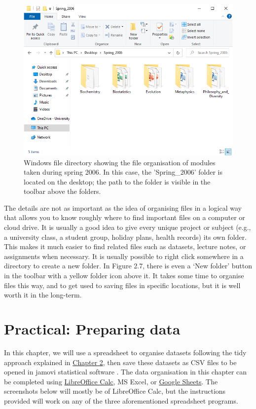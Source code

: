 \documentclass[
]{scrbook}
\begin{document}
\begin{figure}
\includegraphics[width=1\linewidth]{img/directory_windows} \caption{Windows file directory showing the file organisation of modules taken during spring 2006. In this case, the 'Spring\_2006' folder is located on the desktop; the path to the folder is visible in the toolbar above the folders.}\label{fig:unnamed-chunk-10}
\end{figure}

The details are not as important as the idea of organising files in a logical way that allows you to know roughly where to find important files on a computer or cloud drive.
It is usually a good idea to give every unique project or subject (e.g., a university class, a student group, holiday plans, health records) its own folder.
This makes it much easier to find related files such as datasets, lecture notes, or assignments when necessary.
It is usually possible to right click somewhere in a directory to create a new folder.
In Figure 2.7, there is even a `New folder' button in the toolbar with a yellow folder icon above it.
It takes some time to organise files this way, and to get used to saving files in specific locations, but it is well worth it in the long-term.

\hypertarget{Chapter_3}{%
\chapter{Practical: Preparing data}\label{Chapter_3}}

In this chapter, we will use a spreadsheet to organise datasets following the tidy approach explained in \protect\hyperlink{Chapter_2}{Chapter 2}, then save these datasets as CSV files to be opened in jamovi statistical software \citep{Jamovi2022}.
The data organisation in this chapter can be completed using \href{https://www.libreoffice.org/discover/calc/}{LibreOffice Calc}, MS Excel, or \href{https://docs.google.com/spreadsheets/}{Google Sheets}.
The screenshots below will mostly be of LibreOffice Calc, but the instructions provided will work on any of the three aforementioned spreadsheet programs.
\end{document}

